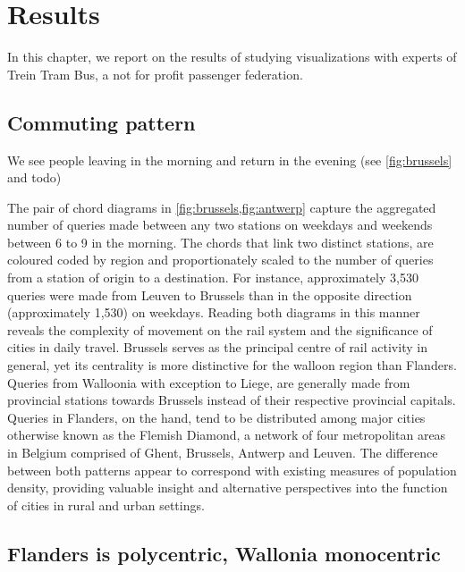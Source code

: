 \documentclass{sig-alternate}
\begin{document}
\section{Results}
\label{sec:results}

In this chapter, we report on the results of studying visualizations with experts of Trein Tram Bus, a not for profit passenger federation.

\subsection{Commuting pattern}

We see people leaving in the morning and return in the evening (see \cref{fig:brussels} and todo)

The pair of chord diagrams in \cref{fig:brussels,fig:antwerp} capture the aggregated number of queries made between any two stations on weekdays and weekends between 6 to 9 in the morning.
The chords that link two distinct stations, are coloured coded by region and proportionately scaled to the number of queries from a station of origin to a destination.
For instance, approximately 3,530 queries were made from Leuven to Brussels than in the opposite direction (approximately 1,530) on weekdays.
Reading both diagrams in this manner reveals the complexity of movement on the rail system and the significance of cities in daily travel.
Brussels serves as the principal centre of rail activity in general, yet its centrality is more distinctive for the walloon region than Flanders.
Queries from Walloonia with exception to Liege, are generally made from provincial stations towards Brussels instead of their respective provincial capitals.
Queries in Flanders, on the hand, tend to be distributed among major cities otherwise known as the Flemish Diamond, a network of four metropolitan areas in Belgium comprised of Ghent, Brussels, Antwerp and Leuven.
The difference between both patterns appear to correspond with existing measures of population density, providing valuable insight and alternative perspectives into the function of cities in rural and urban settings.

\subsection{Flanders is polycentric, Wallonia monocentric}
\end{document}
